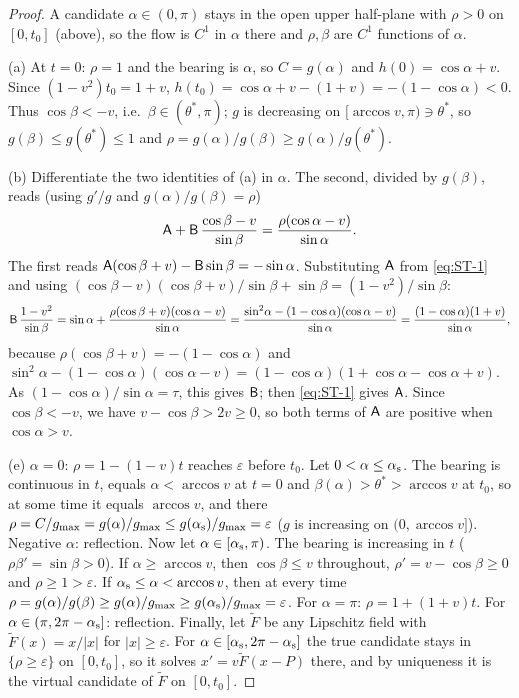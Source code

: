 \begin{proof}
A candidate $\alpha\in(0,\pi)$ stays in the open upper half-plane with $\rho>0$ on $[0,t_0]$ (above), so the flow is $C^1$ in
$\alpha$ there and $\rho,\beta$ are $C^1$ functions of $\alpha$.

(a) At $t=0$: $\rho=1$ and the bearing is $\alpha$, so $C=g(\alpha)$ and $h(0)=\cos\alpha+v$. Since $(1-v^2)t_0=1+v$,
$h(t_0)=\cos\alpha+v-(1+v)=-(1-\cos\alpha)<0$. Thus $\cos\beta<-v$, i.e.\ $\beta\in(\theta^*,\pi)$; $g$ is decreasing on
$[\arccos v,\pi)\ni\theta^*$, so $g(\beta)\le g(\theta^*)\le1$ and $\rho=g(\alpha)/g(\beta)\ge g(\alpha)/g(\theta^*)$.

(b) Differentiate the two identities of (a) in $\alpha$. The second, divided by $g(\beta)$, reads (using $g'/g$ and
$g(\alpha)/g(\beta)=\rho$)
\begin{equation}\label{eq:ST-1}
\mathsf A+\mathsf B\,\frac{\cos\beta-v}{\sin\beta}=\frac{\rho(\cos\alpha-v)}{\sin\alpha}.
\end{equation}
The first reads $\mathsf A(\cos\beta+v)-\mathsf B\sin\beta=-\sin\alpha$. Substituting $\mathsf A$ from \eqref{eq:ST-1} and using
$(\cos\beta-v)(\cos\beta+v)/\sin\beta+\sin\beta=(1-v^2)/\sin\beta$:
\[
\mathsf B\,\frac{1-v^2}{\sin\beta}=\sin\alpha+\frac{\rho(\cos\beta+v)(\cos\alpha-v)}{\sin\alpha}
=\frac{\sin^2\!\alpha-(1-\cos\alpha)(\cos\alpha-v)}{\sin\alpha}=\frac{(1-\cos\alpha)(1+v)}{\sin\alpha},
\]
because $\rho(\cos\beta+v)=-(1-\cos\alpha)$ and $\sin^2\!\alpha-(1-\cos\alpha)(\cos\alpha-v)=(1-\cos\alpha)(1+\cos\alpha-\cos\alpha+v)$.
As $(1-\cos\alpha)/\sin\alpha=\tau$, this gives $\mathsf B$; then \eqref{eq:ST-1} gives $\mathsf A$. Since $\cos\beta<-v$, we have
$v-\cos\beta>2v\ge0$, so both terms of $\mathsf A$ are positive when $\cos\alpha>v$.

(e) $\alpha=0$: $\rho=1-(1-v)t$ reaches $\varepsilon$ before $t_0$. Let $0<\alpha\le\alpha_{\mathrm s}$. The bearing is continuous in $t$, equals
$\alpha<\arccos v$ at $t=0$ and $\beta(\alpha)>\theta^*>\arccos v$ at $t_0$, so at some time it equals $\arccos v$, and there
$\rho=C/g_{\max}=g(\alpha)/g_{\max}\le g(\alpha_{\mathrm s})/g_{\max}=\varepsilon$ ($g$ is increasing on $(0,\arccos v]$). Negative $\alpha$:
reflection. Now let $\alpha\in[\alpha_{\mathrm s},\pi)$. The bearing is increasing in $t$ ($\rho\beta'=\sin\beta>0$). If $\alpha\ge\arccos v$, then
$\cos\beta\le v$ throughout, $\rho'=v-\cos\beta\ge0$ and $\rho\ge1>\varepsilon$. If $\alpha_{\mathrm s}\le\alpha<\arccos v$, then at every time
$\rho=g(\alpha)/g(\beta)\ge g(\alpha)/g_{\max}\ge g(\alpha_{\mathrm s})/g_{\max}=\varepsilon$. For $\alpha=\pi$: $\rho=1+(1+v)t$. For
$\alpha\in(\pi,2\pi-\alpha_{\mathrm s}]$: reflection. Finally, let $\tilde F$ be any Lipschitz field with $\tilde F(x)=x/|x|$ for $|x|\ge\varepsilon$.
For $\alpha\in[\alpha_{\mathrm s},2\pi-\alpha_{\mathrm s}]$ the true candidate stays in $\{\rho\ge\varepsilon\}$ on $[0,t_0]$, so it solves
$x'=v\tilde F(x-P)$ there, and by uniqueness it is the virtual candidate of $\tilde F$ on $[0,t_0]$.


\end{proof}
